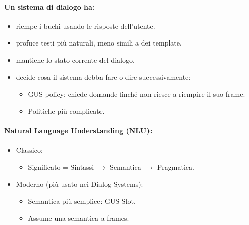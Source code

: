 \paragraph{Un sistema di dialogo ha:}

\begin{itemize}
  \item {} riempe i buchi usando le risposte dell'utente.
  \item {} profuce testi più naturali, meno simili a dei template. 
  \item {} mantiene lo stato corrente del dialogo.
  \item {} decide cosa il sistema debba fare o dire successivamente: 
    \begin{itemize}
      \item GUS policy: chiede domande finché non riesce a riempire il suo frame. 
      \item Politiche più complicate.
    \end{itemize}
\end{itemize}

\paragraph{Natural Language Understanding (NLU):}

\begin{itemize}
  \item Classico: 
    \begin{itemize}
      \item Significato = Sintassi $\rightarrow$ Semantica $\rightarrow$ Pragmatica.
    \end{itemize}
  \item Moderno (più usato nei Dialog Systems): 
    \begin{itemize}
      \item Semantica più semplice: GUS Slot. 
      \item Assume una semantica a frames.
    \end{itemize}
\end{itemize}



